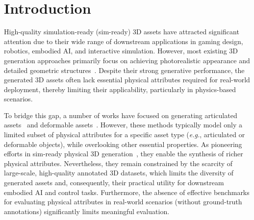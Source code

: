 \documentclass[11pt]{article}
\begin{document}
\vspace{1em}




\clearpage

\tableofcontents
\clearpage

\section{Introduction}

High-quality simulation-ready (sim-ready) 3D assets have attracted significant attention due to their wide range of downstream applications in gaming design, robotics, embodied AI, and interactive simulation. However, most existing 3D generation approaches primarily focus on achieving photorealistic appearance and detailed geometric structures~\cite{trellis,3dtopia,3dtopiaxl,fang2025meshllm,ye2025shapellm,trellis2,zhang2025bang,yang2025omnipart}. Despite their strong generative performance, the generated 3D assets often lack essential physical attributes required for real-world deployment, thereby limiting their applicability, particularly in physics-based scenarios.


To bridge this gap, a number of works have focused on generating articulated assets~\cite{chen2024urdformer,liu2024singapo,le2024articulate,lu2025dreamart,li2026monoart} and deformable assets~\cite{zhang2024physdreamer,guo2024physically,chen2025physgen3d,le2025pixie,chen2025vid2sim,jiang2025phystwin}. However, these methods typically model only a limited subset of physical attributes for a specific asset type (\textit{e.g.}, articulated or deformable objects), while overlooking other essential properties. As pioneering efforts in sim-ready physical 3D generation~\cite{cao2025physx,cao2025physxanything}, they enable the synthesis of richer physical attributes. Nevertheless, they remain constrained by the scarcity of large-scale, high-quality annotated 3D datasets, which limits the diversity of generated assets and, consequently, their practical utility for downstream embodied AI and control tasks. Furthermore, the absence of effective benchmarks for evaluating physical attributes in real-world scenarios (without ground-truth annotations) significantly limits meaningful evaluation.
\end{document}
